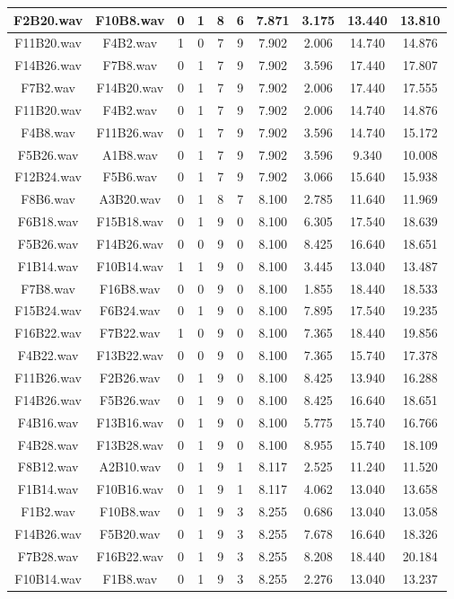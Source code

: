 \documentclass[11pt,a4paper]{book}
\begin{document}
\begin{longtable}[c]{|c|c|c|c|c|c|c|c|c|c|}
F2B20.wav&F10B8.wav&0&1&8&6&7.871&3.175&13.440&13.810\\ \hline
F11B20.wav&F4B2.wav&1&0&7&9&7.902&2.006&14.740&14.876\\ \hline
F14B26.wav&F7B8.wav&0&1&7&9&7.902&3.596&17.440&17.807\\ \hline
F7B2.wav&F14B20.wav&0&1&7&9&7.902&2.006&17.440&17.555\\ \hline
F11B20.wav&F4B2.wav&0&1&7&9&7.902&2.006&14.740&14.876\\ \hline
F4B8.wav&F11B26.wav&0&1&7&9&7.902&3.596&14.740&15.172\\ \hline
F5B26.wav&A1B8.wav&0&1&7&9&7.902&3.596&9.340&10.008\\ \hline
F12B24.wav&F5B6.wav&0&1&7&9&7.902&3.066&15.640&15.938\\ \hline
F8B6.wav&A3B20.wav&0&1&8&7&8.100&2.785&11.640&11.969\\ \hline
F6B18.wav&F15B18.wav&0&1&9&0&8.100&6.305&17.540&18.639\\ \hline
F5B26.wav&F14B26.wav&0&0&9&0&8.100&8.425&16.640&18.651\\ \hline
F1B14.wav&F10B14.wav&1&1&9&0&8.100&3.445&13.040&13.487\\ \hline
F7B8.wav&F16B8.wav&0&0&9&0&8.100&1.855&18.440&18.533\\ \hline
F15B24.wav&F6B24.wav&0&1&9&0&8.100&7.895&17.540&19.235\\ \hline
F16B22.wav&F7B22.wav&1&0&9&0&8.100&7.365&18.440&19.856\\ \hline
F4B22.wav&F13B22.wav&0&0&9&0&8.100&7.365&15.740&17.378\\ \hline
F11B26.wav&F2B26.wav&0&1&9&0&8.100&8.425&13.940&16.288\\ \hline
F14B26.wav&F5B26.wav&0&1&9&0&8.100&8.425&16.640&18.651\\ \hline
F4B16.wav&F13B16.wav&0&1&9&0&8.100&5.775&15.740&16.766\\ \hline
F4B28.wav&F13B28.wav&0&1&9&0&8.100&8.955&15.740&18.109\\ \hline
F8B12.wav&A2B10.wav&0&1&9&1&8.117&2.525&11.240&11.520\\ \hline
F1B14.wav&F10B16.wav&0&1&9&1&8.117&4.062&13.040&13.658\\ \hline
F1B2.wav&F10B8.wav&0&1&9&3&8.255&0.686&13.040&13.058\\ \hline
F14B26.wav&F5B20.wav&0&1&9&3&8.255&7.678&16.640&18.326\\ \hline
F7B28.wav&F16B22.wav&0&1&9&3&8.255&8.208&18.440&20.184\\ \hline
F10B14.wav&F1B8.wav&0&1&9&3&8.255&2.276&13.040&13.237\\ \hline

\end{longtable}
\end{document}
